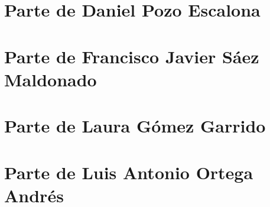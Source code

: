 \documentclass[11pt]{article}
\begin{document}
\section{Parte de Daniel Pozo Escalona}
 \newpage

\section{Parte de Francisco Javier Sáez Maldonado}

 \newpage

\section{Parte de Laura Gómez Garrido} 

 \newpage

\section{Parte de Luis Antonio Ortega Andrés}

 
 
 
 
 
 
\end{document}
